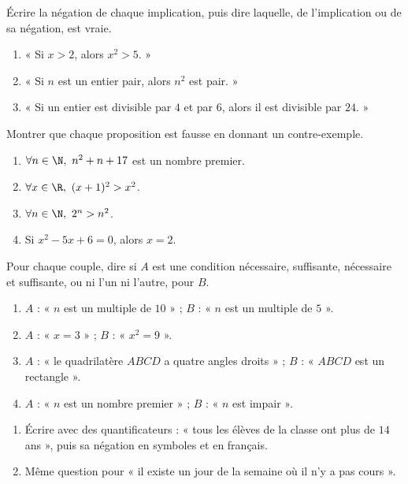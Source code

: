 \begin{exercise}
Écrire la négation de chaque implication, puis dire laquelle, de l'implication ou de sa négation, est vraie.
\begin{enumerate}
\item « Si $x>2$, alors $x^2>5$. »
\item « Si $n$ est un entier pair, alors $n^2$ est pair. »
\item « Si un entier est divisible par $4$ et par $6$, alors il est divisible par $24$. »
\end{enumerate}
\end{exercise}
\begin{exercise}
Montrer que chaque proposition est fausse en donnant un contre-exemple.
\begin{enumerate}
\item $\forall n\in\N,\ n^2+n+17$ est un nombre premier.
\item $\forall x\in\R,\ (x+1)^2>x^2$.
\item $\forall n\in\N,\ 2^n>n^2$.
\item Si $x^2-5x+6=0$, alors $x=2$.
\end{enumerate}
\end{exercise}
\begin{exercise}
Pour chaque couple, dire si $A$ est une condition nécessaire, suffisante, nécessaire et suffisante, ou ni l'un ni l'autre, pour $B$.
\begin{enumerate}
\item $A$ : « $n$ est un multiple de $10$ » ; $B$ : « $n$ est un multiple de $5$ ».
\item $A$ : « $x=3$ » ; $B$ : « $x^2=9$ ».
\item $A$ : « le quadrilatère $ABCD$ a quatre angles droits » ; $B$ : « $ABCD$ est un rectangle ».
\item $A$ : « $n$ est un nombre premier » ; $B$ : « $n$ est impair ».
\end{enumerate}
\end{exercise}
\begin{exercise}
\begin{enumerate}
\item Écrire avec des quantificateurs : « tous les élèves de la classe ont plus de $14$ ans », puis sa négation en symboles et en français.
\item Même question pour « il existe un jour de la semaine où il n'y a pas cours ».
\end{enumerate}
\end{exercise}
